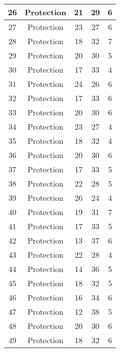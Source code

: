 \documentclass[results.tex]{subfiles}
\begin{document}
\begin{center}
\begin{tabular}{| c || c | c | c | c |}
    \hline
    26 & Protection & 21 & 29 & 6 \\ 
    \hline
    27 & Protection & 23 & 27 & 6 \\ 
    \hline
    28 & Protection & 18 & 32 & 7 \\ 
    \hline
    29 & Protection & 20 & 30 & 5 \\ 
    \hline
    30 & Protection & 17 & 33 & 4 \\ 
    \hline
    31 & Protection & 24 & 26 & 6 \\ 
    \hline
    32 & Protection & 17 & 33 & 6 \\ 
    \hline
    33 & Protection & 20 & 30 & 6 \\ 
    \hline
    34 & Protection & 23 & 27 & 4 \\ 
    \hline
    35 & Protection & 18 & 32 & 4 \\ 
    \hline
    36 & Protection & 20 & 30 & 6 \\ 
    \hline
    37 & Protection & 17 & 33 & 5 \\ 
    \hline
    38 & Protection & 22 & 28 & 5 \\ 
    \hline
    39 & Protection & 26 & 24 & 4 \\ 
    \hline
    40 & Protection & 19 & 31 & 7 \\ 
    \hline
    41 & Protection & 17 & 33 & 5 \\ 
    \hline
    42 & Protection & 13 & 37 & 6 \\ 
    \hline
    43 & Protection & 22 & 28 & 4 \\ 
    \hline
    44 & Protection & 14 & 36 & 5 \\ 
    \hline
    45 & Protection & 18 & 32 & 5 \\ 
    \hline
    46 & Protection & 16 & 34 & 6 \\ 
    \hline
    47 & Protection & 12 & 38 & 5 \\ 
    \hline
    48 & Protection & 20 & 30 & 6 \\ 
    \hline
    49 & Protection & 18 & 32 & 6 \\ 
    \hline   \end{tabular}
\end{center}
\end{document}
